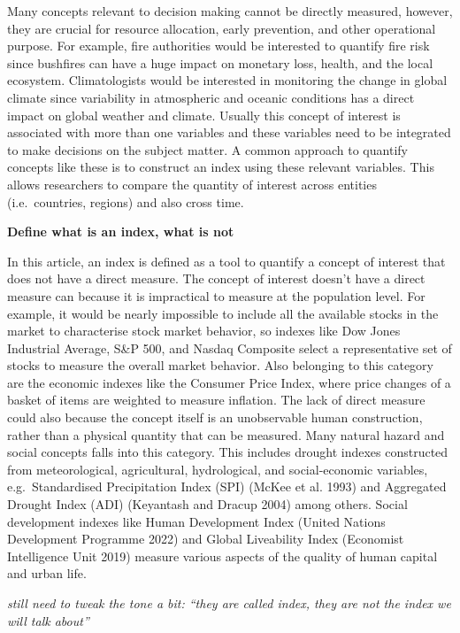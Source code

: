 \documentclass[
  letterpaper,
  DIV=11,
  numbers=noendperiod]{scrartcl}
\begin{document}
Many concepts relevant to decision making cannot be directly measured,
however, they are crucial for resource allocation, early prevention, and
other operational purpose. For example, fire authorities would be
interested to quantify fire risk since bushfires can have a huge impact
on monetary loss, health, and the local ecosystem. Climatologists would
be interested in monitoring the change in global climate since
variability in atmospheric and oceanic conditions has a direct impact on
global weather and climate. Usually this concept of interest is
associated with more than one variables and these variables need to be
integrated to make decisions on the subject matter. A common approach to
quantify concepts like these is to construct an index using these
relevant variables. This allows researchers to compare the quantity of
interest across entities (i.e.~countries, regions) and also cross time.

\textbf{Define what is an index, what is not}

In this article, an index is defined as a tool to quantify a concept of
interest that does not have a direct measure. The concept of interest
doesn't have a direct measure can because it is impractical to measure
at the population level. For example, it would be nearly impossible to
include all the available stocks in the market to characterise stock
market behavior, so indexes like Dow Jones Industrial Average, S\&P 500,
and Nasdaq Composite select a representative set of stocks to measure
the overall market behavior. Also belonging to this category are the
economic indexes like the Consumer Price Index, where price changes of a
basket of items are weighted to measure inflation. The lack of direct
measure could also because the concept itself is an unobservable human
construction, rather than a physical quantity that can be measured. Many
natural hazard and social concepts falls into this category. This
includes drought indexes constructed from meteorological, agricultural,
hydrological, and social-economic variables, e.g.~Standardised
Precipitation Index (SPI) (McKee et al. 1993) and Aggregated Drought
Index (ADI) (Keyantash and Dracup 2004) among others. Social development
indexes like Human Development Index (United Nations Development
Programme 2022) and Global Liveability Index (Economist Intelligence
Unit 2019) measure various aspects of the quality of human capital and
urban life.

\emph{still need to tweak the tone a bit: ``they are called index, they
are not the index we will talk about''}
\end{document}
